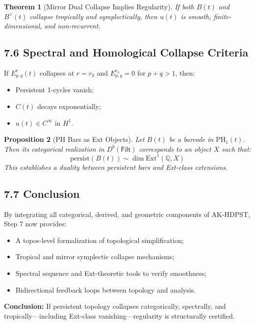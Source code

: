 \documentclass[11pt]{article}
\newtheorem{theorem}{Theorem}[section]
\newtheorem{proposition}[theorem]{Proposition}
\theoremstyle{definition}
\begin{document}
\begin{theorem}[Mirror Dual Collapse Implies Regularity]
If both $B(t)$ and $B^\vee(t)$ collapse tropically and symplectically, then $u(t)$ is smooth, finite-dimensional, and non-recurrent.
\end{theorem}

\subsection*{7.6 Spectral and Homological Collapse Criteria}

If $E^r_{p,q}(t)$ collapses at $r = r_0$ and $E^{r_0}_{p,q}=0$ for $p+q>1$, then:
\begin{itemize}
  \item Persistent 1-cycles vanish;
  \item $C(t)$ decays exponentially;
  \item $u(t) \in C^\infty$ in $H^1$.
\end{itemize}

\begin{proposition}[PH Bars as Ext Objects]
Let $B(t)$ be a barcode in $\mathrm{PH}_1(t)$. Then its categorical realization in $D^b(\mathsf{Filt})$ corresponds to an object $X$ such that:
\[
\text{persist}(B(t)) \sim \dim \mathrm{Ext}^1(\mathbb{Q}, X)
\]
This establishes a duality between persistent bars and Ext-class extensions.
\end{proposition}

\subsection*{7.7 Conclusion}

By integrating all categorical, derived, and geometric components of AK-HDPST, Step 7 now provides:
\begin{itemize}
  \item A topos-level formalization of topological simplification;
  \item Tropical and mirror symplectic collapse mechanisms;
  \item Spectral sequence and Ext-theoretic tools to verify smoothness;
  \item Bidirectional feedback loops between topology and analysis.
\end{itemize}
\textbf{Conclusion:} If persistent topology collapses categorically, spectrally, and tropically---including Ext-class vanishing---regularity is structurally certified.
\end{document}
